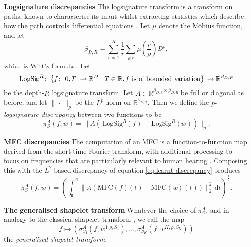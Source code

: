 \documentclass{article}
\theoremstyle{plain}
\theoremstyle{definition}
\newcommand{\set}[2]{\left\{#1\,\left\vert\,#2\vphantom{#1}\right\}\right.}
\newcommand{\reals}{\mathbb{R}}
\newcommand{\norm}[1]{\|#1\|}
\newcommand{\dee}{\,\mathrm{d}}
\newcommand{\logsig}{\mathrm{LogSig}}
\newcommand{\mfc}{\mathrm{MFC}}
\newcommand{\boldheading}[1]{

\textbf{#1}\quad}
\begin{document}
	\boldheading{Logsignature discrepancies}
	The logsignature transform is a transform on paths, known to characterise its input whilst extracting statistics which describe how the path controls differential equations \cite{logsig-rnn, levy-lyons, kidger2019deep, signatory}. Let $\mu$ denote the M{\"o}bius function, and let
	\begin{equation*}
	\beta_{D, R} = \sum_{r = 1}^R \frac{1}{r} \sum_{\rho \vert r} \mu\left(\frac{r}{\rho}\right) D^\rho,
	\end{equation*}
	which is Witt's formula \cite{witt}. Let
	\begin{equation*}
	\logsig^R \colon \set{f \colon [0, T] \to \reals^D}{T \in \reals, f\text{ is of bounded variation}} \to \reals^{\beta_{D, R}}
	\end{equation*}
	be the depth-$R$ logsignature transform. Let $A \in \reals^{\beta_{D, R} \times \beta_{D, R}}$ be full or diagonal as before, and let $\norm{\,\cdot\,}_p$ be the $L^p$ norm on $\reals^{\beta_{D, R}}$. Then we define the \emph{$p$-logsignature discrepancy} between two functions to be
	\begin{equation}\label{eq:logsignature-discrepancy}
	\pi^A_{S}(f, w) = \norm{A(\,\logsig^R(f) - \,\logsig^R(w))}_p.
	\end{equation}
	
	\boldheading{MFC discrepancies}
	The computation of an MFC is a function-to-function map derived from the short-time Fourier transform, with additional processing to focus on frequencies that are particularly relevant to human hearing \cite{mfc}. Composing this with the $L^2$ based discrepancy of equation \eqref{eq:learnt-discrepancy} produces
	\begin{equation}\label{eq:mfc-discrepancy}
	\pi^A_{S}(f, w) = (\int_{0}^{S} \norm{A(\mfc(f)(t) - \mfc(w)(t))}_2^2 \dee t)^{\frac{1}{2}}.
	\end{equation}
	
	\boldheading{The generalised shapelet transform}
	Whatever the choice of $\pi^A_S$, and in analogy to the classical shapelet transform \cite{hills2014classification}, we call the map
	\begin{equation*}
	f \mapsto (\sigma^A_{S_1}(f, w^{1, \rho, S_1}), \ldots, \sigma^A_{S_K}(f, w^{K, \rho, S_K}))
	\end{equation*}
	the \emph{generalised shapelet transform}.
	
\end{document}
